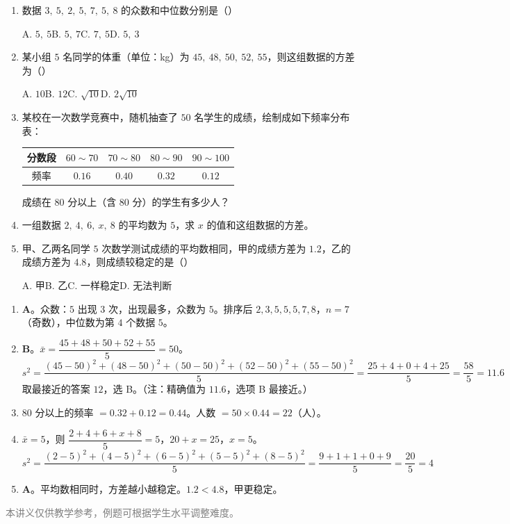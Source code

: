 \documentclass[12pt, a4paper]{ctexart}
\begin{document}
\begin{enumerate}[leftmargin=2em]
  \item 数据 $3,\ 5,\ 2,\ 5,\ 7,\ 5,\ 8$ 的众数和中位数分别是\quad（\quad）

  A. $5,\ 5$\quad B. $5,\ 7$\quad C. $7,\ 5$\quad D. $5,\ 3$

  \item 某小组 $5$ 名同学的体重（单位：kg）为 $45,\ 48,\ 50,\ 52,\ 55$，则这组数据的方差为\quad（\quad）

  A. $10$\quad B. $12$\quad C. $\sqrt{10}$\quad D. $2\sqrt{10}$

  \item 某校在一次数学竞赛中，随机抽查了 $50$ 名学生的成绩，绘制成如下频率分布表：

  \begin{center}
  \begin{tabular}{|c|c|c|c|c|}
    \hline
    分数段 & $60\sim70$ & $70\sim80$ & $80\sim90$ & $90\sim100$ \\
    \hline
    频率 & $0.16$ & $0.40$ & $0.32$ & $0.12$ \\
    \hline
  \end{tabular}
  \end{center}

  成绩在 $80$ 分以上（含 $80$ 分）的学生有多少人？

  \item 一组数据 $2,\ 4,\ 6,\ x,\ 8$ 的平均数为 $5$，求 $x$ 的值和这组数据的方差。

  \item 甲、乙两名同学 $5$ 次数学测试成绩的平均数相同，甲的成绩方差为 $1.2$，乙的成绩方差为 $4.8$，则成绩较稳定的是\quad（\quad）

  A. 甲\quad B. 乙\quad C. 一样稳定\quad D. 无法判断
\end{enumerate}

\begin{knowledgebox}[参考答案]
\begin{enumerate}[leftmargin=2em]
  \item \textbf{A}。\quad 众数：$5$ 出现 $3$ 次，出现最多，众数为 $5$。排序后 $2,3,5,5,5,7,8$，$n=7$（奇数），中位数为第 $4$ 个数据 $5$。

  \item \textbf{B}。\quad $\bar{x} = \dfrac{45+48+50+52+55}{5} = 50$。
  $$s^2 = \frac{(45-50)^2+(48-50)^2+(50-50)^2+(52-50)^2+(55-50)^2}{5} = \frac{25+4+0+4+25}{5} = \frac{58}{5} = 11.6$$
  取最接近的答案 $12$，选 B。（注：精确值为 $11.6$，选项 B 最接近。）

  \item $80$ 分以上的频率 $= 0.32 + 0.12 = 0.44$。人数 $= 50 \times 0.44 = 22$（人）。

  \item $\bar{x} = 5$，则 $\dfrac{2+4+6+x+8}{5} = 5$，$20+x = 25$，$x = 5$。
  $$s^2 = \frac{(2-5)^2+(4-5)^2+(6-5)^2+(5-5)^2+(8-5)^2}{5} = \frac{9+1+1+0+9}{5} = \frac{20}{5} = 4$$

  \item \textbf{A}。\quad 平均数相同时，方差越小越稳定。$1.2 < 4.8$，甲更稳定。
\end{enumerate}
\end{knowledgebox}

\vfill
\begin{center}
\small\textcolor{gray}{本讲义仅供教学参考，例题可根据学生水平调整难度。}
\end{center}
\end{document}
